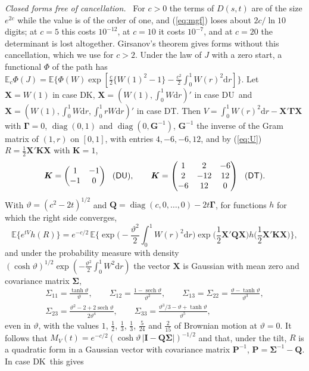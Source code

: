 \documentclass[ecta,nameyear,final]{econsocart}
\newcommand{\E}{{\mathbb E}}
\newcommand{\dr}[1]{{\mathrm d}#1}
\newcommand{\sech}{\operatorname{sech}}
\newcommand{\diag}{\operatorname{diag}}
\newcommand{\Fk}{\textsf{\upshape DK}}
\newcommand{\Fu}{\textsf{\upshape DU}}
\newcommand{\Ft}{\textsf{\upshape DT}}
\newcommand{\bX}{\boldsymbol{X}}
\newcommand{\bQ}{\boldsymbol{Q}}
\newcommand{\bK}{\boldsymbol{K}}
\newcommand{\bI}{\boldsymbol{I}}
\newcommand{\bGam}{\boldsymbol{\Gamma}}
\newcommand{\bSig}{\boldsymbol{\Sigma}}
\newcommand{\bP}{\boldsymbol{P}}
\newcommand{\bG}{\boldsymbol{G}}
\theoremstyle{plain}
\theoremstyle{definition}
\newcommand{\runin}[1]{\par\medskip\noindent\textit{#1.}\ \ignorespaces}
\begin{document}
\runin{Closed forms free of cancellation}  For $c>0$ the terms of $D(s,t)$ are of the size $e^{2c}$ while the value is of the order of one, and (\ref{eq:mgf}) loses about $2c/\ln10$ digits; at $c=5$ this costs $10^{-12}$, at $c=10$ it costs $10^{-7}$, and at $c=20$ the determinant is lost altogether.  Girsanov's theorem gives forms without this cancellation, which we use for $c>2$.  Under the law of $J$ with a zero start, a functional $\Phi$ of the path has $\E_c\Phi(J)=\E\{\Phi(W)\exp[\frac c2\{W(1)^2-1\}-\frac{c^2}2\int_0^1W(r)^2\dr{r}]\}$.  Let $\bX=W(1)$ in case \Fk, $\bX=(W(1),\int_0^1W\dr{r})'$ in case \Fu\ and $\bX=(W(1),\int_0^1W\dr{r},\int_0^1rW\dr{r})'$ in case \Ft.  Then $V=\int_0^1W(r)^2\dr{r}-\bX'\bGam\bX$ with $\bGam=0$, $\diag(0,1)$ and $\diag(0,\bG^{-1})$, $\bG^{-1}$ the inverse of the Gram matrix of $(1,r)$ on $[0,1]$, with entries $4,-6,-6,12$, and by (\ref{eq:U}) $R=\frac12\bX'\bK\bX$ with $\bK=1$,
\[
\bK=\begin{pmatrix}1&-1\\-1&0\end{pmatrix}\ \ (\Fu),\qquad
\bK=\begin{pmatrix}1&2&-6\\2&-12&12\\-6&12&0\end{pmatrix}\ \ (\Ft).
\]
With $\vartheta=(c^2-2t)^{1/2}$ and $\bQ=\diag(c,0,\ldots,0)-2t\bGam$, for functions $h$ for which the right side converges,
\begin{equation}
\E\big\{e^{tV}h(R)\big\}=e^{-c/2}\,\E\Big\{\exp\Big(-\frac{\vartheta^2}2\int_0^1W(r)^2\dr{r}\Big)\exp\Big(\frac12\bX'\bQ\bX\Big)h\Big(\frac12\bX'\bK\bX\Big)\Big\},
\label{eq:girsanov}
\end{equation}
and under the probability measure with density $(\cosh\vartheta)^{1/2}\exp(-\frac{\vartheta^2}2\int_0^1W^2\dr{r})$ the vector $\bX$ is Gaussian with mean zero and covariance matrix $\bSig$,
\begin{gather*}
\Sigma_{11}=\frac{\tanh\vartheta}\vartheta,\qquad\Sigma_{12}=\frac{1-\sech\vartheta}{\vartheta^2},\qquad\Sigma_{13}=\Sigma_{22}=\frac{\vartheta-\tanh\vartheta}{\vartheta^3},\\
\Sigma_{23}=\frac{\vartheta^2-2+2\sech\vartheta}{2\vartheta^4},\qquad\Sigma_{33}=\frac{\vartheta^3/3-\vartheta+\tanh\vartheta}{\vartheta^5},
\end{gather*}
even in $\vartheta$, with the values $1$, $\frac12$, $\frac13$, $\frac13$, $\frac5{24}$ and $\frac2{15}$ of Brownian motion at $\vartheta=0$.  It follows that $M_V(t)=e^{-c/2}(\cosh\vartheta\,|\bI-\bQ\bSig|)^{-1/2}$ and that, under the tilt, $R$ is a quadratic form in a Gaussian vector with covariance matrix $\bP^{-1}$, $\bP=\bSig^{-1}-\bQ$.  In case \Fk\ this gives
\end{document}
